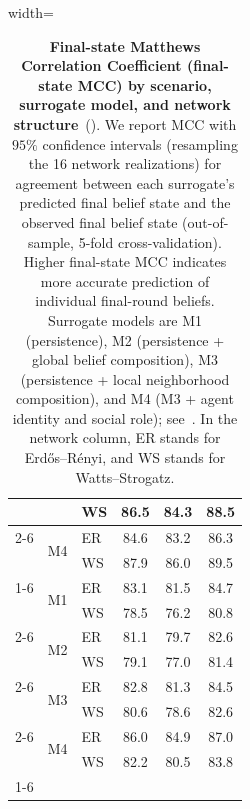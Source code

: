 \begin{table}[ht]
\begin{adjustbox}{width=\columnwidth}
\begin{tabular}{lllccc}
 &  & WS & 86.5 & 84.3 & 88.5 \\
\cline{2-6}
 & \multirow[c]{2}{*}{M4} & ER & 84.6 & 83.2 & 86.3 \\
 &  & WS & 87.9 & 86.0 & 89.5 \\
\cline{1-6} \cline{2-6}
\multirow[c]{8}{*}{IV. Specialists (matched)} & \multirow[c]{2}{*}{M1} & ER & 83.1 & 81.5 & 84.7 \\
 &  & WS & 78.5 & 76.2 & 80.8 \\
\cline{2-6}
 & \multirow[c]{2}{*}{M2} & ER & 81.1 & 79.7 & 82.6 \\
 &  & WS & 79.1 & 77.0 & 81.4 \\
\cline{2-6}
 & \multirow[c]{2}{*}{M3} & ER & 82.8 & 81.3 & 84.5 \\
 &  & WS & 80.6 & 78.6 & 82.6 \\
\cline{2-6}
 & \multirow[c]{2}{*}{M4} & ER & 86.0 & 84.9 & 87.0 \\
 &  & WS & 82.2 & 80.5 & 83.8 \\
\cline{1-6} \cline{2-6}
\bottomrule
\end{tabular}
\end{adjustbox}
\caption{\textbf{Final-state Matthews Correlation Coefficient (final-state MCC) by scenario, surrogate model, and network structure}~(). We report MCC with \(95\%\) confidence intervals (resampling the 16 network realizations) for agreement between each surrogate's predicted final belief state and the observed final belief state (out-of-sample, 5-fold cross-validation). Higher final-state MCC indicates more accurate prediction of individual final-round beliefs. Surrogate models are M1 (persistence), M2 (persistence + global belief composition), M3 (persistence + local neighborhood composition), and M4 (M3 + agent identity and social role); see~. In the network column, ER stands for Erd\H{o}s--R\'enyi, and WS stands for Watts--Strogatz.}
\label{tab:final-mcc}
\end{table}
